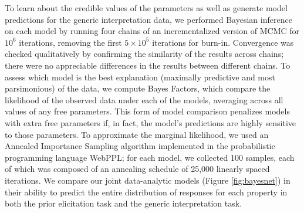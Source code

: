 \documentclass[floatsintext,man]{apa6}
\begin{document}
To learn about the credible values of the parameters as well as generate model predictions for the generic interpretation data, we performed Bayesian inference on each model by running four chains of an incrementalized version of MCMC \cite{Ritchie2016} for $10^6$ iterations, removing the first $5 \times 10^5$ iterations for burn-in.
Convergence was checked qualitatively by confirming the similarity of the results across chains; there were no appreciable differences in the results between different chains.
To assess which model is the best explanation (maximally predictive and most parsimonious) of the data, we compute Bayes Factors, which compare the likelihood of the observed data under each of the models, averaging across all values of any free parameters.
This form of model comparison penalizes models with extra free parameters if, in fact, the model's predictions are highly sensitive to those parameters.
To approximate the marginal likelihood, we used an Annealed Importance Sampling algorithm \cite{neal2001annealed} implemented in the probabilistic programming language WebPPL; for each model, we collected 100 samples, each of which was composed of an annealing schedule of 25,000 linearly spaced iterations.
We compare our joint data-analytic models (Figure \ref{fig:bayesnet}) in their ability to predict the entire distribution of responses for each property in both the prior elicitation task and the generic interpretation task. 
\end{document}
